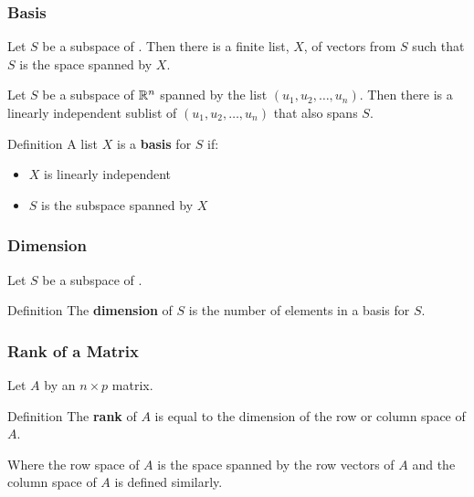 \documentclass{beamer}
\begin{document}
\begin{frame}
  \frametitle{Basis}

Let $S$ be a subspace of \RealN.  Then there is a finite list, $X$, of vectors from $S$ such that $S$ is the space spanned by $X$.
\medskip

Let $S$ be a subspace of $\mathbb{R}^n$ spanned by the list $(u_1, u_2, \ldots, u_n)$. Then there is a linearly independent sublist of $(u_1, u_2, \ldots, u_n)$ that also spans $S$.
\medskip

\begin{block}{Definition}
A list $X$ is a \textbf{basis} for $S$ if:
\begin{itemize}
\item $X$ is linearly independent
\item $S$ is the subspace spanned by $X$
\end{itemize}
\end{block}

\end{frame}

\begin{frame}
  \frametitle{Dimension}
Let $S$ be a subspace of \RealN.
\bigskip

\begin{block}{Definition}
The \textbf{dimension} of $S$ is the number of elements in a basis for $S$.
\end{block}

\end{frame}


\begin{frame}
  \frametitle{Rank of a Matrix}
Let $A$ by an $n \times p$ matrix.
\bigskip

\begin{block}{Definition}
The \textbf{rank} of $A$ is equal to the dimension of the row or column space of $A$.

\end{block}
\bigskip
Where the row space of $A$ is the space spanned by the row vectors of $A$ and the column space of $A$ is defined similarly.

\end{frame}
\end{document}
